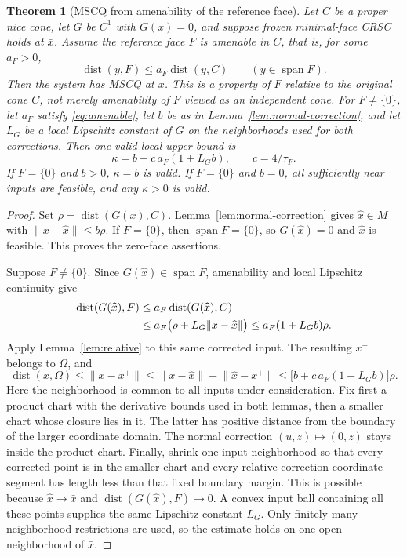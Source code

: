 \documentclass[11pt]{article}
\numberwithin{equation}{section}
\newtheorem{theorem}{Theorem}[section]
\theoremstyle{definition}
\theoremstyle{remark}
\DeclareMathOperator{\dist}{dist}
\DeclareMathOperator{\spann}{span}
\newcommand{\xb}{\bar x}
\newcommand{\xhat}{\widehat x}
\newcommand{\norm}[1]{\lVert #1\rVert}
\newcommand{\dset}[2]{\dist(#1,#2)}
\begin{document}
\begin{theorem}[MSCQ from amenability of the reference face]
\label{thm:mscq}
Let $C$ be a proper nice cone, let $G$ be $C^1$ with $G(\xb)=0$, and
suppose frozen minimal-face CRSC holds at $\xb$. Assume the reference face
$F$ is amenable in $C$, that is, for some $a_F>0$,
\[
 \dset{y}{F}\leq a_F\dset{y}{C}\qquad(y\in\spann F).
\]
Then the system has MSCQ at $\xb$. This is a property of $F$
relative to the original cone $C$, not merely amenability of $F$
viewed as an independent cone.
For $F\ne\{0\}$, let $a_F$ satisfy \eqref{eq:amenable}, let $b$ be as
in Lemma~\ref{lem:normal-correction}, and let $L_G$ be a local
Lipschitz constant of $G$ on the neighborhoods used for both corrections.
Then one valid local upper bound is
\begin{equation}
 \boxed{\kappa=b+c\,a_F(1+L_Gb),\qquad c=4/\tau_F.}
 \label{eq:kappa}
\end{equation}
If $F=\{0\}$ and $b>0$, $\kappa=b$ is valid. If $F=\{0\}$ and
$b=0$, all sufficiently near inputs are feasible, and any $\kappa>0$
is valid.
\end{theorem}
\begin{proof}
Set $\rho=\dset{G(x)}{C}$. Lemma~\ref{lem:normal-correction} gives
$\xhat\in M$ with $\norm{x-\xhat}\leq b\rho$.
If $F=\{0\}$, then $\spann F=\{0\}$, so $G(\xhat)=0$ and
$\xhat$ is feasible. This proves the zero-face assertions.

Suppose $F\ne\{0\}$. Since $G(\xhat)\in\spann F$, amenability
and local Lipschitz continuity give
\begin{align}
 \dset{G(\xhat)}{F}
 &\leq a_F\dset{G(\xhat)}{C}\notag\\
 &\leq a_F\bigl(\rho+L_G\norm{x-\xhat}\bigr)
 \leq a_F(1+L_Gb)\rho.
 \label{eq:amenable-chain}
\end{align}
Apply Lemma~\ref{lem:relative} to this same corrected input. The resulting
$x^+$ belongs to $\Omega$, and
\[
 \dset{x}{\Omega}\leq\norm{x-x^+}
 \leq\norm{x-\xhat}+\norm{\xhat-x^+}
 \leq\bigl[b+c\,a_F(1+L_Gb)\bigr]\rho.
\]
Here the neighborhood is common to all inputs under consideration.
Fix first a product chart with the derivative bounds used in both lemmas,
then a smaller chart whose closure lies in it. The latter has positive
distance from the boundary of the larger coordinate domain. The normal
correction $(u,z)\mapsto(0,z)$ stays inside the product chart. Finally,
shrink one input neighborhood so that every corrected point is in the
smaller chart and every relative-correction coordinate segment has length
less than that fixed boundary margin. This is possible because
$\xhat\to\xb$ and $\dset{G(\xhat)}{F}\to0$. A convex input ball
containing all these points supplies the same Lipschitz constant $L_G$.
Only finitely many neighborhood restrictions are used, so the estimate
holds on one open neighborhood of $\xb$.
\end{proof}
\end{document}
